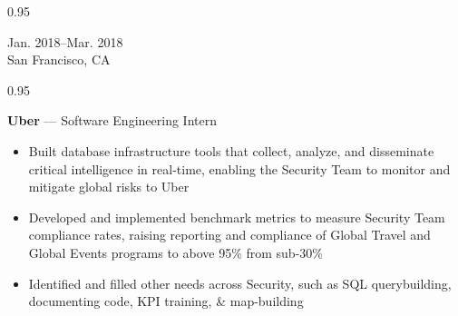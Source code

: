 \documentclass[a4paper,9pt]{article}
\newcommand{\mainMarginBottom}{\vspace*{1.5pt}}
\newcommand{\newLine}{\\}
\newcommand{\doubleColumnGap}{\hspace{4mm}}
\newcommand{\withinSectionMarginBetween}{\vspace{-3ex}}
\newcommand{\mainLineSpacing}{0.95}
\begin{document}
\withinSectionMarginBetween{}

\begin{minipage}[t]{0.20\linewidth}
	\begin{small}
		\begin{spacing}\mainLineSpacing{}
			\begin{flushright}
				Jan. 2018--Mar. 2018
				\newLine{}
				\mainMarginBottom{}
				San Francisco, CA
			\end{flushright}
		\end{spacing}
	\end{small}
\end{minipage}
\doubleColumnGap{}
\begin{minipage}[t]{0.75\linewidth}
	\begin{small}
		\begin{spacing}\mainLineSpacing{}
			\begin{flushleft}
				\textbf{Uber} --- Software Engineering Intern
				\mainMarginBottom{}
				\begin{itemize}[itemsep=0pt,topsep=0pt,leftmargin=*]
					\item Built database infrastructure tools that collect, analyze, and disseminate critical intelligence in real-time, enabling the Security Team to monitor and mitigate global risks to Uber
					\item Developed and implemented benchmark metrics to measure Security Team compliance rates, raising reporting and compliance of Global Travel and Global Events programs to above 95\% from sub-30\%
					\item Identified and filled other needs across Security, such as SQL querybuilding, documenting code, KPI training, \& map-building
				\end{itemize}
			\end{flushleft}
		\end{spacing}
	\end{small}
\end{minipage}

\withinSectionMarginBetween{}
\end{document}

